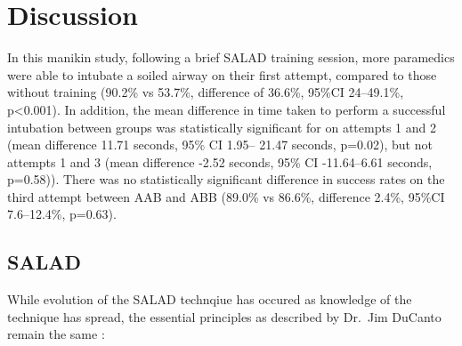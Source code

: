 \documentclass[]{article}
\begin{document}
\hypertarget{discussion}{%
\section{Discussion}\label{discussion}}

In this manikin study, following a brief SALAD training session, more
paramedics were able to intubate a soiled airway on their first attempt,
compared to those without training (90.2\% vs 53.7\%, difference of
36.6\%, 95\%CI 24--49.1\%, p\textless{}0.001). In addition, the mean
difference in time taken to perform a successful intubation between
groups was statistically significant for on attempts 1 and 2 (mean
difference 11.71 seconds, 95\% CI 1.95-- 21.47 seconds, p=0.02), but not
attempts 1 and 3 (mean difference -2.52 seconds, 95\% CI -11.64--6.61
seconds, p=0.58)). There was no statistically significant difference in
success rates on the third attempt between AAB and ABB (89.0\% vs
86.6\%, difference 2.4\%, 95\%CI 7.6--12.4\%, p=0.63).

\hypertarget{salad}{%
\subsection{SALAD}\label{salad}}

While evolution of the SALAD technqiue has occured as knowledge of the
technique has spread, the essential principles as described by Dr.~Jim
DuCanto remain the same \citep{ducanto_novel_2017}:
\end{document}
